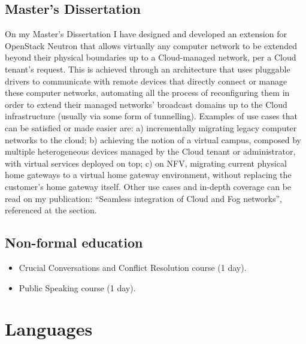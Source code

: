 \documentclass[letter,10pt]{article} %
\begin{document}
\subsection{Master's Dissertation}
On my Master's Dissertation I have designed and developed an extension for OpenStack Neutron that allows virtually any computer network to be extended beyond their physical boundaries up to a Cloud-managed network, per a Cloud tenant's request. This is achieved through an architecture that uses pluggable drivers to communicate with remote devices that directly connect or manage these computer networks, automating all the process of reconfiguring them in order to extend their managed networks' broadcast domains up to the Cloud infrastructure (usually via some form of tunnelling). Examples of use cases that can be satisfied or made easier are: a) incrementally migrating legacy computer networks to the cloud; b) achieving the notion of a virtual campus, composed by multiple heterogeneous devices managed by the Cloud tenant or administrator, with virtual services deployed on top; c) on NFV, migrating current physical home gateways to a virtual home gateway environment, without replacing the customer's home gateway itself. Other use cases and in-depth coverage can be read on my publication: ``Seamless integration of Cloud and Fog networks'', referenced at the  section.

\subsection{Non-formal education}
\begin{itemize}
    \item Crucial Conversations and Conflict Resolution course (1 day).
    \item Public Speaking course (1 day).
\end{itemize}


\section{Languages}
\end{document}
